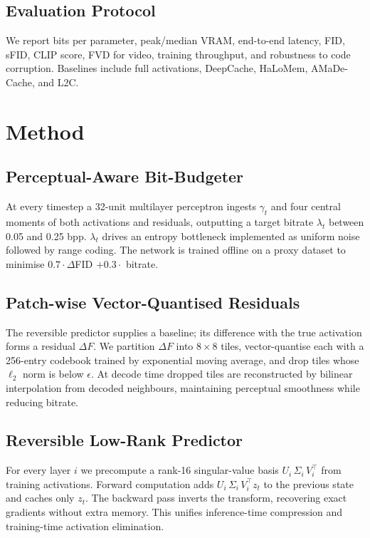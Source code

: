 \documentclass{article}
\begin{document}
\subsection{Evaluation Protocol}
We report bits per parameter, peak/median VRAM, end-to-end latency, FID, sFID, CLIP score, FVD for video, training throughput, and robustness to code corruption. Baselines include full activations, DeepCache, HaLoMem, AMaDe-Cache, and L2C.

\section{Method}
\subsection{Perceptual-Aware Bit-Budgeter}
At every timestep a 32-unit multilayer perceptron ingests $\gamma_t$ and four central moments of both activations and residuals, outputting a target bitrate $\lambda_t$ between 0.05 and 0.25 bpp. $\lambda_t$ drives an entropy bottleneck implemented as uniform noise followed by range coding. The network is trained offline on a proxy dataset to minimise $0.7\cdot\Delta$FID $+ 0.3\cdot$ bitrate.

\subsection{Patch-wise Vector-Quantised Residuals}
The reversible predictor supplies a baseline; its difference with the true activation forms a residual $\Delta F$. We partition $\Delta F$ into $8\times8$ tiles, vector-quantise each with a 256-entry codebook trained by exponential moving average, and drop tiles whose $\ell_2$ norm is below $\epsilon$. At decode time dropped tiles are reconstructed by bilinear interpolation from decoded neighbours, maintaining perceptual smoothness while reducing bitrate.

\subsection{Reversible Low-Rank Predictor}
For every layer $i$ we precompute a rank-16 singular-value basis $U_i\,\Sigma_i\,V_i^{\top}$ from training activations. Forward computation adds $U_i\,\Sigma_i\,V_i^{\top} z_t$ to the previous state and caches only $z_t$. The backward pass inverts the transform, recovering exact gradients without extra memory. This unifies inference-time compression and training-time activation elimination.
\end{document}
